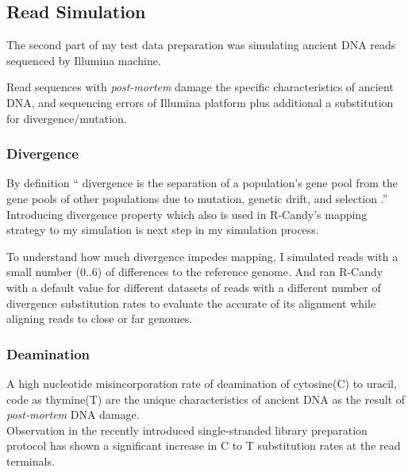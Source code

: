 \documentclass[11pt,a4paper]{report}
\newcommand{\quotes}[1]{``#1''}
\begin{document}
\subsection{Read Simulation}

The second part of my test data preparation was simulating 
ancient DNA reads sequenced by Illumina machine.

Read sequences with \emph{post-mortem }damage \cite{damagepattern}
the specific characteristics of ancient DNA, and sequencing errors \cite{phred1} of Illumina platform plus additional a substitution for divergence/mutation.


\subsubsection{Divergence}

By definition \quotes{ divergence is the separation
of a population's gene pool from the gene pools of other populations 
due to mutation, genetic drift, and selection \cite{divergence2}.}\\

Introducing divergence property which also is used in R-Candy's mapping strategy to my simulation is next step in my simulation process. 

To understand how much divergence impedes mapping, 
I simulated reads with a small number (0..6) of differences to the reference genome.
And ran R-Candy with a default value for different datasets of reads with a different number of divergence substitution rates to evaluate the accurate of its alignment while aligning reads to close or far genomes.

\subsubsection{Deamination}

A high nucleotide misincorporation rate of  deamination of cytosine(C) to uracil, code as thymine(T) are the unique characteristics of ancient DNA as the result of \emph{post-mortem} DNA damage\cite{mapdamage2}\cite{damagepattern}.\\ 

Observation in the recently introduced single-stranded library preparation protocol
has shown a significant increase in C to T substitution rates at the read terminals\cite{mapdamage2}.\\
\end{document}
